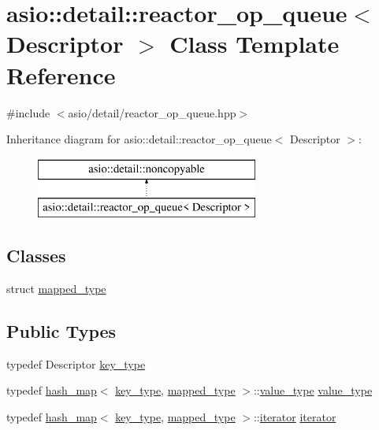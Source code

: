 \hypertarget{classasio_1_1detail_1_1reactor__op__queue}{}\section{asio\+:\+:detail\+:\+:reactor\+\_\+op\+\_\+queue$<$ Descriptor $>$ Class Template Reference}
\label{classasio_1_1detail_1_1reactor__op__queue}


{\ttfamily \#include $<$asio/detail/reactor\+\_\+op\+\_\+queue.\+hpp$>$}

Inheritance diagram for asio\+:\+:detail\+:\+:reactor\+\_\+op\+\_\+queue$<$ Descriptor $>$\+:\begin{figure}[H]
\begin{center}
\leavevmode
\includegraphics[height=2.000000cm]{classasio_1_1detail_1_1reactor__op__queue}
\end{center}
\end{figure}
\subsection*{Classes}
\begin{DoxyCompactItemize}
\item 
struct \hyperlink{structasio_1_1detail_1_1reactor__op__queue_1_1mapped__type}{mapped\+\_\+type}
\end{DoxyCompactItemize}
\subsection*{Public Types}
\begin{DoxyCompactItemize}
\item 
typedef Descriptor \hyperlink{classasio_1_1detail_1_1reactor__op__queue_ae750b96efe78afd9b508725eedcd6b8b}{key\+\_\+type}
\item 
typedef \hyperlink{classasio_1_1detail_1_1hash__map}{hash\+\_\+map}$<$ \hyperlink{classasio_1_1detail_1_1reactor__op__queue_ae750b96efe78afd9b508725eedcd6b8b}{key\+\_\+type}, \hyperlink{structasio_1_1detail_1_1reactor__op__queue_1_1mapped__type}{mapped\+\_\+type} $>$\+::\hyperlink{classasio_1_1detail_1_1reactor__op__queue_ac701f8db7606c9f4f1457116046b7b31}{value\+\_\+type} \hyperlink{classasio_1_1detail_1_1reactor__op__queue_ac701f8db7606c9f4f1457116046b7b31}{value\+\_\+type}
\item 
typedef \hyperlink{classasio_1_1detail_1_1hash__map}{hash\+\_\+map}$<$ \hyperlink{classasio_1_1detail_1_1reactor__op__queue_ae750b96efe78afd9b508725eedcd6b8b}{key\+\_\+type}, \hyperlink{structasio_1_1detail_1_1reactor__op__queue_1_1mapped__type}{mapped\+\_\+type} $>$\+::\hyperlink{classasio_1_1detail_1_1reactor__op__queue_a3c73fd6c8576d3a1ad1eb4f320f2395a}{iterator} \hyperlink{classasio_1_1detail_1_1reactor__op__queue_a3c73fd6c8576d3a1ad1eb4f320f2395a}{iterator}
\end{DoxyCompactItemize}
